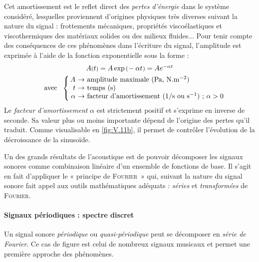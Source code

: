Cet amortissement est le reflet direct des \emph{pertes d'énergie} dans le système considéré, lesquelles proviennent d'origines physiques très diverses suivant la nature du signal : frottements mécaniques, propriétés viscoélastiques et viscothermiques des matériaux solides ou des milieux fluides... 
Pour tenir compte des conséquences de ces phénomènes dans l'écriture du signal, l'amplitude est exprimée à l'aide de la fonction exponentielle sous la forme :
\begin{equation}
\begin{array}{c}
A\vars{t} = A \exp\vars{\!-\alpha t\:\!} = A e^{-\alpha t} \\[1ex]
~~~~\mbox{avec~~}\left \{ \begin{tabular}[c]{@{\,}r@{~}l@{}}
$A$ $\rightarrow$ & amplitude maximale (Pa, $\mbox{N}.\mbox{m}^{-2}$)\\
$t$ $\rightarrow$ & temps (s)\\
$\alpha$ $\rightarrow$ & facteur d'amortissement (1/s ou $\mbox{s}^{-1}$) ; $\alpha > 0$\\
\end{tabular}\right.
\end{array}
\end{equation}
Le \emph{facteur d'amortissement} $\alpha$ est strictement positif et s'exprime en inverse de seconde. Sa valeur plus ou moins importante dépend de l'origine des pertes qu'il traduit. Comme visualisable en \cref{fig:V.11b}, il permet de contrôler l'évolution de la décroissance de la sinusoïde.




Un des grands résultats de l'acoustique est de pouvoir décomposer les signaux sonores comme combinaison linéaire d'un ensemble de fonctions de base. Il s'agit en fait d'appliquer le « principe de \textsc{Fourier}~» qui, suivant la nature du signal sonore fait appel aux outils mathématiques adéquats : \emph{séries} et \emph{transformées} de \textsc{Fourier}.


\paragraph*{Signaux périodiques : spectre discret} Un signal sonore \emph{périodique} ou \emph{quasi-périodique} peut se décomposer en \emph{série de Fourier}. Ce cas de figure est celui de nombreux signaux musicaux et permet une première approche des phénomènes.

